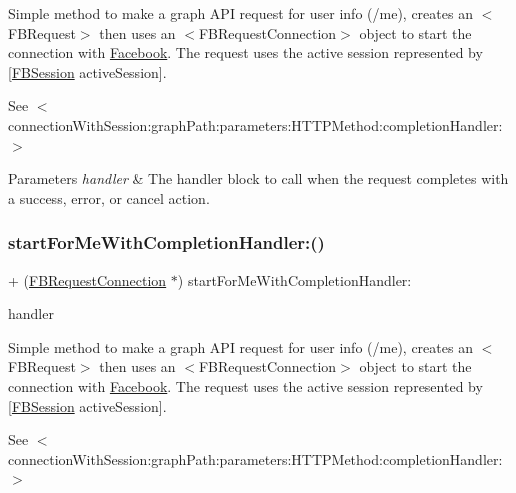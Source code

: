 Simple method to make a graph A\+PI request for user info (/me), creates an $<$\+F\+B\+Request$>$ then uses an $<$\+F\+B\+Request\+Connection$>$ object to start the connection with \hyperlink{interfaceFacebook}{Facebook}. The request uses the active session represented by {\ttfamily \mbox{[}\hyperlink{interfaceFBSession}{F\+B\+Session} active\+Session\mbox{]}}.

See $<$connection\+With\+Session\+:graph\+Path\+:parameters\+:\+H\+T\+T\+P\+Method\+:completion\+Handler\+:$>$


\begin{DoxyParams}{Parameters}
{\em handler} & The handler block to call when the request completes with a success, error, or cancel action. \\
\hline
\end{DoxyParams}
\mbox{\label{interfaceFBRequestConnection_a9d89090f947eacfdf441172f842f5bc8}} 
\subsubsection{\texorpdfstring{start\+For\+Me\+With\+Completion\+Handler\+:()}{startForMeWithCompletionHandler:()}\hspace{0.1cm}{\footnotesize\ttfamily [5/5]}}
{\footnotesize\ttfamily + (\hyperlink{interfaceFBRequestConnection}{F\+B\+Request\+Connection} $\ast$) start\+For\+Me\+With\+Completion\+Handler\+: \begin{DoxyParamCaption}\item[{(F\+B\+Request\+Handler)}]{handler }\end{DoxyParamCaption}}

Simple method to make a graph A\+PI request for user info (/me), creates an $<$\+F\+B\+Request$>$ then uses an $<$\+F\+B\+Request\+Connection$>$ object to start the connection with \hyperlink{interfaceFacebook}{Facebook}. The request uses the active session represented by {\ttfamily \mbox{[}\hyperlink{interfaceFBSession}{F\+B\+Session} active\+Session\mbox{]}}.

See $<$connection\+With\+Session\+:graph\+Path\+:parameters\+:\+H\+T\+T\+P\+Method\+:completion\+Handler\+:$>$



